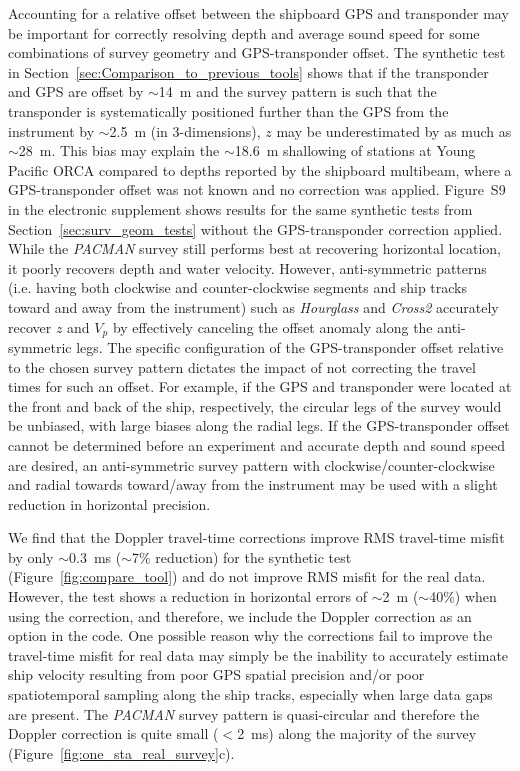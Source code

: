 Accounting for a relative offset between the shipboard GPS and transponder may be important for correctly resolving depth and average sound speed for some combinations of survey geometry and GPS-transponder offset. The synthetic test in Section~\ref{sec:Comparison_to_previous_tools} shows that if the transponder and GPS are offset by $\sim$14~m and the survey pattern is such that the transponder is systematically positioned further than the GPS from the instrument by $\sim$2.5~m (in 3-dimensions), $z$ may be underestimated by as much as $\sim$28~m. This bias may explain the $\sim$18.6~m shallowing of stations at Young Pacific ORCA compared to depths reported by the shipboard multibeam, where a GPS-transponder offset was not known and no correction was applied. Figure~S9 in the electronic supplement shows results for the same synthetic tests from Section~\ref{sec:surv_geom_tests} without the GPS-transponder correction applied. While the \textit{PACMAN} survey still performs best at recovering horizontal location, it poorly recovers depth and water velocity. However, anti-symmetric patterns (i.e. having both clockwise and counter-clockwise segments and ship tracks toward and away from the instrument) such as \textit{Hourglass} and \textit{Cross2} accurately recover $z$ and $V_p$ by effectively canceling the offset anomaly along the anti-symmetric legs. The specific configuration of the GPS-transponder offset relative to the chosen survey pattern dictates the impact of not correcting the travel times for such an offset. For example, if the GPS and transponder were located at the front and back of the ship, respectively, the circular legs of the survey would be unbiased, with large biases along the radial legs. If the GPS-transponder offset cannot be determined before an experiment and accurate depth and sound speed are desired, an anti-symmetric survey pattern with clockwise/counter-clockwise and radial towards toward/away from the instrument may be used with a slight reduction in horizontal precision.

We find that the Doppler travel-time corrections improve RMS travel-time misfit by only $\sim$0.3~ms ($\sim$7\% reduction) for the synthetic test (Figure~\ref{fig:compare_tool}) and do not improve RMS misfit for the real data. However, the test shows a reduction in horizontal errors of $\sim$2~m ($\sim$40\%) when using the correction, and therefore, we include the Doppler correction as an option in the code. One possible reason why the corrections fail to improve the travel-time misfit for real data may simply be the inability to accurately estimate ship velocity resulting from poor GPS spatial precision and/or poor spatiotemporal sampling along the ship tracks, especially when large data gaps are present. The \textit{PACMAN} survey pattern is quasi-circular and therefore the Doppler correction is quite small ($<$2~ms) along the majority of the survey (Figure~\ref{fig:one_sta_real_survey}c).

